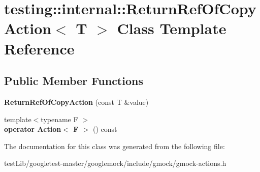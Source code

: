 \hypertarget{classtesting_1_1internal_1_1ReturnRefOfCopyAction}{}\section{testing\+:\+:internal\+:\+:Return\+Ref\+Of\+Copy\+Action$<$ T $>$ Class Template Reference}
\label{classtesting_1_1internal_1_1ReturnRefOfCopyAction}
\subsection*{Public Member Functions}
\begin{DoxyCompactItemize}
\item 
\mbox{\label{classtesting_1_1internal_1_1ReturnRefOfCopyAction_a073c18a8b50423b08f6603e860622839}} 
{\bfseries Return\+Ref\+Of\+Copy\+Action} (const T \&value)
\item 
\mbox{\label{classtesting_1_1internal_1_1ReturnRefOfCopyAction_a8b4829fbb46c3ca6468f3eb5c5b42493}} 
{\footnotesize template$<$typename F $>$ }\\{\bfseries operator Action$<$ F $>$} () const
\end{DoxyCompactItemize}


The documentation for this class was generated from the following file\+:\begin{DoxyCompactItemize}
\item 
test\+Lib/googletest-\/master/googlemock/include/gmock/gmock-\/actions.\+h\end{DoxyCompactItemize}
